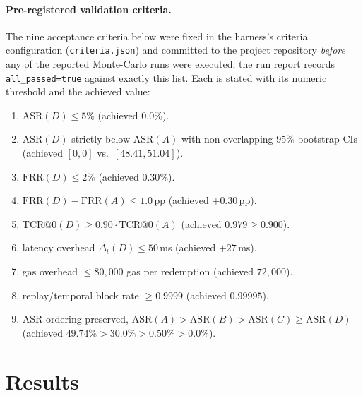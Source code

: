 \documentclass[10pt,twocolumn,letterpaper]{article}
\begin{document}
\paragraph{Pre-registered validation criteria.} The nine acceptance criteria below were fixed in the harness's criteria configuration (\texttt{criteria.json}) and committed to the project repository \emph{before} any of the reported Monte-Carlo runs were executed; the run report records \texttt{all\_passed=true} against exactly this list. Each is stated with its numeric threshold and the achieved value:
\begin{enumerate}
\item $\mathrm{ASR}(D)\le 5\%$ \;(achieved $0.0\%$).
\item $\mathrm{ASR}(D)$ strictly below $\mathrm{ASR}(A)$ with non-overlapping 95\% bootstrap CIs \;(achieved $[0,0]$ vs.\ $[48.41,51.04]$).
\item $\mathrm{FRR}(D)\le 2\%$ \;(achieved $0.30\%$).
\item $\mathrm{FRR}(D)-\mathrm{FRR}(A)\le 1.0$\,pp \;(achieved $+0.30$\,pp).
\item $\mathrm{TCR@0}(D)\ge 0.90\cdot\mathrm{TCR@0}(A)$ \;(achieved $0.979\ge 0.900$).
\item latency overhead $\Delta_t(D)\le 50$\,ms \;(achieved $+27$\,ms).
\item gas overhead $\le 80{,}000$ gas per redemption \;(achieved $72{,}000$).
\item replay/temporal block rate $\ge 0.9999$ \;(achieved $0.99995$).
\item ASR ordering preserved, $\mathrm{ASR}(A)>\mathrm{ASR}(B)>\mathrm{ASR}(C)\ge\mathrm{ASR}(D)$ \;(achieved $49.74\%>30.0\%>0.50\%>0.0\%$).
\end{enumerate}

\section{Results}
\label{sec:results}
\end{document}
